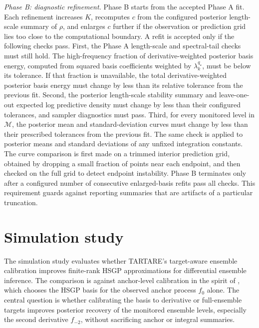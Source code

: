 \documentclass[11pt,a4paper]{article}
\theoremstyle{definition}
\theoremstyle{remark}
\begin{document}
\emph{Phase B: diagnostic refinement.} Phase B starts from the accepted Phase A fit. Each refinement increases \(K\), recomputes \(c\) from the configured posterior length-scale summary of \(\rho\), and enlarges \(c\) further if the observation or prediction grid lies too close to the computational boundary. A refit is accepted only if the following checks pass. First, the Phase A length-scale and spectral-tail checks must still hold. The high-frequency fraction of derivative-weighted posterior basis energy, computed from squared basis coefficients weighted by \(\lambda_k^{q_\star}\), must be below its tolerance. If that fraction is unavailable, the total derivative-weighted posterior basis energy must change by less than its relative tolerance from the previous fit. Second, the posterior length-scale stability summary and leave-one-out expected log predictive density must change by less than their configured tolerances, and sampler diagnostics must pass. Third, for every monitored level in \(\mathcal M\), the posterior mean and standard-deviation curves must change by less than their prescribed tolerances from the previous fit. The same check is applied to posterior means and standard deviations of any unfixed integration constants. The curve comparison is first made on a trimmed interior prediction grid, obtained by dropping a small fraction of points near each endpoint, and then checked on the full grid to detect endpoint instability. Phase B terminates only after a configured number of consecutive enlarged-basis refits pass all checks. This requirement guards against reporting summaries that are artifacts of a particular truncation.



\section{Simulation study}\label{sec:simulation}

The simulation study evaluates whether TARTARE's target-aware ensemble calibration improves finite-rank HSGP approximations for differential ensemble inference. The comparison is against anchor-level calibration in the spirit of \citet{riutort2023practical}, which chooses the HSGP basis for the observed anchor process \(f_0\) alone. The central question is whether calibrating the basis to derivative or full-ensemble targets improves posterior recovery of the monitored ensemble levels, especially the second derivative \(f_{-2}\), without sacrificing anchor or integral summaries.
\end{document}

